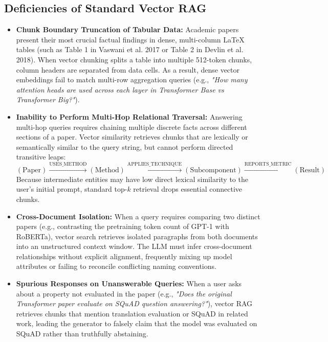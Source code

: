 \subsection{Deficiencies of Standard Vector RAG}
\begin{itemize}
    \item \textbf{Chunk Boundary Truncation of Tabular Data:} Academic papers present their most crucial factual findings in dense, multi-column LaTeX tables (such as Table 1 in Vaswani et al. 2017 or Table 2 in Devlin et al. 2018). When vector chunking splits a table into multiple 512-token chunks, column headers are separated from data cells. As a result, dense vector embeddings fail to match multi-row aggregation queries (e.g., \textit{"How many attention heads are used across each layer in Transformer Base vs Transformer Big?"}).
    \item \textbf{Inability to Perform Multi-Hop Relational Traversal:} Answering multi-hop queries requires chaining multiple discrete facts across different sections of a paper. Vector similarity retrieves chunks that are lexically or semantically similar to the query string, but cannot perform directed transitive leaps:
    \begin{equation}
        (\text{Paper}) \xrightarrow{\text{USES\_METHOD}} (\text{Method}) \xrightarrow{\text{APPLIES\_TECHNIQUE}} (\text{Subcomponent}) \xrightarrow{\text{REPORTS\_METRIC}} (\text{Result})
    \end{equation}
    Because intermediate entities may have low direct lexical similarity to the user's initial prompt, standard top-$k$ retrieval drops essential connective chunks.
    \item \textbf{Cross-Document Isolation:} When a query requires comparing two distinct papers (e.g., contrasting the pretraining token count of GPT-1 with RoBERTa), vector search retrieves isolated paragraphs from both documents into an unstructured context window. The LLM must infer cross-document relationships without explicit alignment, frequently mixing up model attributes or failing to reconcile conflicting naming conventions.
    \item \textbf{Spurious Responses on Unanswerable Queries:} When a user asks about a property not evaluated in the paper (e.g., \textit{"Does the original Transformer paper evaluate on SQuAD question answering?"}), vector RAG retrieves chunks that mention translation evaluation or SQuAD in related work, leading the generator to falsely claim that the model was evaluated on SQuAD rather than truthfully abstaining.
\end{itemize}

